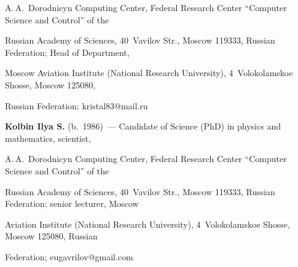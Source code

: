 A.\,A.~Dorodnicyn Computing Center, Federal Research Center ``Computer Science and Control'' of the 


Russian Academy of Sciences, 40~Vavilov Str., Moscow 119333, Russian Federation; Head of Department, 


Moscow Aviation Institute (National Research University), 4~Volokolamskoe Shosse, Moscow 125080, 


Russian Federation; \mbox{kristal83@mail.ru}


  


  \vspace*{6pt}


  


  \noindent


  \textbf{Kolbin Ilya S.} (b.\ 1986)~--- Candidate of Science (PhD) in physics and mathematics, scientist, 


A.\,A.~Dorodnicyn Computing Center, Federal Research Center ``Computer Science and Control'' of the 


Russian Academy of Sciences, 40~Vavilov Str., Moscow 119333, Russian Federation; senior lecturer, Moscow 


Aviation Institute (National Research University), 4~Volokolamskoe Shosse, Moscow 125080, Russian 


Federation; \mbox{eugavrilov@gmail.com}


\label{end\stat}





\renewcommand{\bibname}{\protect\rm Литература} 


    


